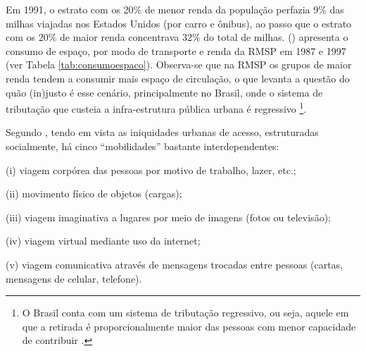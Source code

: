 Em 1991, o estrato com os 20\% de menor renda da população perfazia 9\% das milhas viajadas nos Estados Unidos (por carro e ônibus), ao passo que o estrato com os 20\% de maior renda concentrava 32\% do total de milhas.
 (\citeyear{VASCONCELLOS2001}) apresenta o consumo de espaço, por modo de transporte e renda da RMSP em 1987 e 1997 (ver Tabela \ref{tab:consumoespaco}). Observa-se que na RMSP os grupos de maior renda tendem a consumir mais espaço de circulação, o que levanta a questão do quão (in)justo é esse cenário, principalmente no Brasil, onde o sistema de tributação que custeia a infra-estrutura pública urbana é regressivo%
\footnote{O Brasil conta com um sistema de tributação regressivo, ou seja, aquele em que a retirada é proporcionalmente maior das pessoas com menor capacidade de contribuir \cite{GRECO2005}.}.

Segundo , tendo em vista as iniquidades urbanas de acesso, estruturadas socialmente, há cinco ``mobilidades'' bastante interdependentes:
\begin{compactitem}[]
\item (i) viagem corpórea das pessoas por motivo de trabalho, lazer, etc.;
\item (ii) movimento físico de objetos (cargas);
\item (iii) viagem imaginativa a lugares por meio de imagens (fotos ou televisão);
\item (iv) viagem virtual mediante uso da internet; 
\item (v) viagem comunicativa através de mensagens trocadas entre pessoas (cartas, mensagens de celular, telefone).
\end{compactitem}

\clearpage

